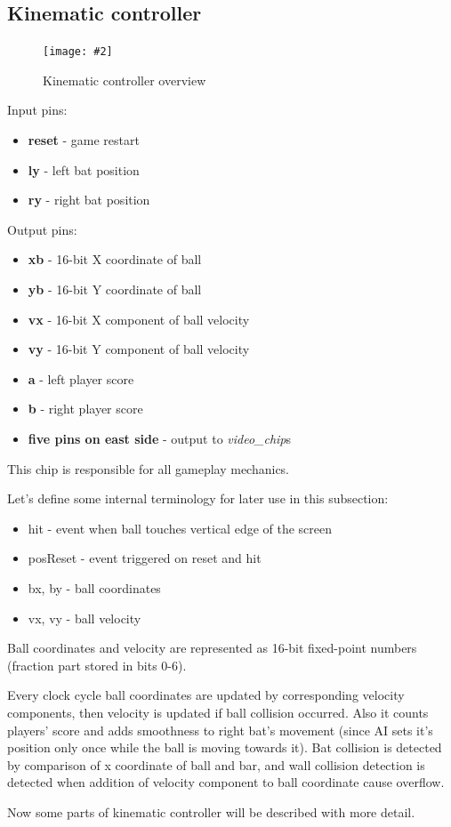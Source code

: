 \documentclass[12pt,a4paper]{article}
\newcommand{\dofigure}[3][H]{
    \begin{figure}[#1]
        \centering
        \texttt{[image: \#2]}
        \caption{#3}
    \end{figure}
}
\newcommand{\chip}[1]{{\itshape#1}}
\newcommand{\pin}[1]{\textbf{#1}}
\newenvironment{pins}{
    
    \let\oldpin\pin
    \renewcommand{\pin}[1]{\item\oldpin{##1}}
    \newcommand{\inputs}[1]{
        
    Input pins:\begin{itemize}##1\end{itemize}}
    \newcommand{\outputs}[1]{
        
    Output pins:\begin{itemize}##1\end{itemize}}
}{}
\begin{document}
    \subsection{Kinematic controller}
    \dofigure{kinematic_overview}{Kinematic controller overview}
    \begin{pins}
        \inputs{
            \pin{reset} - game restart
            \pin{ly} - left bat position
            \pin{ry} - right bat position
        }
        \outputs{
            \pin{xb} - 16-bit X coordinate of ball
            \pin{yb} - 16-bit Y coordinate of ball
            \pin{vx} - 16-bit X component of ball velocity
            \pin{vy} - 16-bit Y component of ball velocity
            \pin{a} - left player score
            \pin{b} - right player score
            \pin{five pins on east side} - output to \chip{video\_chip}s
        }
    \end{pins}
    This chip is responsible for all gameplay mechanics.

    Let's define some internal terminology for later use in this subsection:\begin{itemize}
        \item hit - event when ball touches vertical edge of the screen
        \item posReset - event triggered on reset and hit
        \item bx, by - ball coordinates
        \item vx, vy - ball velocity
    \end{itemize}
    Ball coordinates and velocity are represented as 16-bit fixed-point numbers (fraction part stored in bits 0-6).


    Every clock cycle  ball coordinates are updated by corresponding velocity components, then velocity is updated if ball collision occurred. Also it counts players' score and adds smoothness to right bat's movement (since AI sets it's position only once while the ball is moving towards it). Bat collision is detected by comparison of x coordinate of ball and bar, and wall collision detection is detected when addition of velocity component to ball coordinate cause overflow.
    
    

    Now some parts of kinematic controller will be described with more detail.
\end{document}
